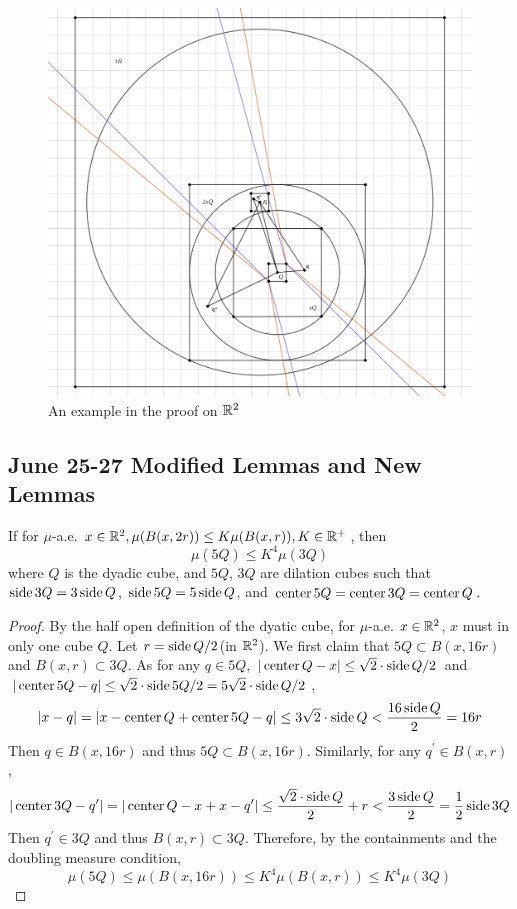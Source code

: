 \begin{figure}[H]
    \centering
    \includegraphics[width=.8\textwidth]{images/tRcover2sQ.png}
    \caption{An example in the proof on $\mathbb{R}^2$}
\end{figure}


\newpage
\subsection{June 25-27 Modified Lemmas and New Lemmas}
\begin{lemma}
    If for $\mu$-a.e. $x\in \mathbb{R}^2, \mu(B(x, 2r))\leq K\mu(B(x,r)), K\in\mathbb{R}^+$, then
    $$\mu(5Q)\leq K^4 \mu(3Q)$$ where $Q$ is the dyadic cube, and $5Q$, $3Q$ are dilation cubes such that $\operatorname{side} 3Q = 3\operatorname{side} Q$, $\operatorname{side} 5Q = 5\operatorname{side} Q$, and $\operatorname{center} 5Q = \operatorname{center} 3Q = \operatorname{center} Q$.
\end{lemma}
\begin{proof} By the half open definition of the dyatic cube, for $\mu$-a.e. $x\in \mathbb{R}^2$, $x$ must in only one cube $Q$. Let $r = \operatorname{side} Q /2$(in $\mathbb{R}^2$). We first claim that $5Q\subset B(x, 16r)$ and $B(x, r)\subset 3Q$. As for any $q\in 5Q$, $|\operatorname{center} Q -x|\leq \sqrt{2}\cdot\operatorname{side} Q /2$ and $|\operatorname{center} 5Q -q|\leq \sqrt{2}\cdot\operatorname{side} 5Q /2 = 5\sqrt{2}\cdot \operatorname{side} Q/2$, 
    \begin{equation*}
        |x-q| = |x-\operatorname{center} Q + \operatorname{center} 5Q-q | \leq 3\sqrt{2}\cdot \operatorname{side} Q < \frac{16\operatorname{side} Q}{2} = 16r
    \end{equation*}
Then $q\in B(x, 16r)$ and thus $5Q\subset B(x, 16r)$. Similarly, for any $q^\prime\in B(x, r)$, 
\begin{equation*}
    |\operatorname{center} 3Q - q^\prime| = |\operatorname{center} Q - x + x-q^\prime| \leq \frac{\sqrt{2}\cdot\operatorname{side} Q}{2} + r < \frac{3\operatorname{side} Q}{2} = \frac{1}{2}\operatorname{side} 3Q
\end{equation*}
Then $q^\prime\in 3Q$ and thus $B(x, r)\subset 3Q$. Therefore, by the containments and the doubling measure condition, 
    \begin{equation}
        \mu(5Q) \leq \mu(B(x, 16r)) \leq K^4\mu(B(x,r))\leq K^4\mu(3Q)
    \end{equation}
\end{proof}

